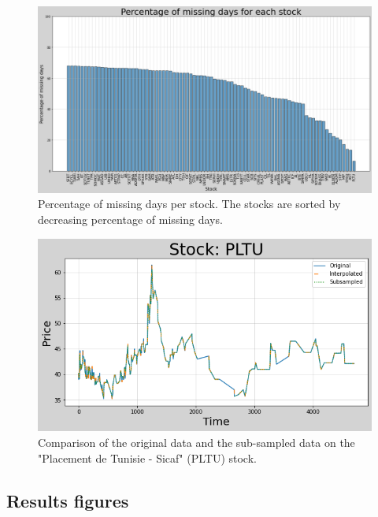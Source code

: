 \documentclass[11pt]{article}
\begin{document}
\begin{figure}[H]
    \centering
    \begin{minipage}[t]{0.75\textwidth}
        \includegraphics[width=\textwidth]{figures/preprocessing/bar_missing_days.png}
        \caption{Percentage of missing days per stock. The stocks are sorted by decreasing percentage of missing days.}
        \label{fig:bar_missing_days}
    \end{minipage}
\end{figure}

\begin{figure}[H]
    \centering
    \begin{minipage}[t]{0.7\textwidth}
        \includegraphics[width=\textwidth]{figures/preprocessing/subsample.png}
        \caption{Comparison of the original data and the sub-sampled data on the "Placement de Tunisie - Sicaf" (PLTU) stock.}
        \label{fig:subsample}
    \end{minipage}
\end{figure}

\subsection{Results figures}
\end{document}

